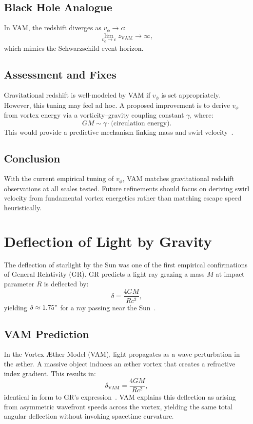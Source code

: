 \documentclass[a4paper, aps,preprint,superscriptaddress, 12pt]{revtex4}
\begin{document}
\subsection*{Black Hole Analogue}
In VAM, the redshift diverges as $v_\phi \to c$:
\[
    \lim_{v_\phi \to c} z_\text{VAM} \to \infty,
\]
which mimics the Schwarzschild event horizon.

\subsection*{Assessment and Fixes}
Gravitational redshift is well-modeled by VAM if $v_\phi$ is set appropriately. However, this tuning may feel ad hoc. A proposed improvement is to derive $v_\phi$ from vortex energy via a vorticity--gravity coupling constant $\gamma$, where:
\[
    GM \sim \gamma \cdot \text{(circulation energy)}.
\]
This would provide a predictive mechanism linking mass and swirl velocity~\cite{iskandarani2025VAM2}.

\subsection*{Conclusion}
With the current empirical tuning of $v_\phi$, VAM matches gravitational redshift observations at all scales tested. Future refinements should focus on deriving swirl velocity from fundamental vortex energetics rather than matching escape speed heuristically.
\section{Deflection of Light by Gravity}

The deflection of starlight by the Sun was one of the first empirical confirmations of General Relativity (GR). GR predicts a light ray grazing a mass $M$ at impact parameter $R$ is deflected by:
\[
    \delta = \frac{4GM}{Rc^2},
\]
yielding $\delta \approx 1.75"$ for a ray passing near the Sun~\cite{will2014confrontation}.

\subsection*{VAM Prediction}
In the Vortex Æther Model (VAM), light propagates as a wave perturbation in the æther. A massive object induces an æther vortex that creates a refractive index gradient. This results in:
\[
    \delta_\text{VAM} = \frac{4GM}{Rc^2},
\]
identical in form to GR's expression~\cite{iskandarani2025VAM2}. VAM explains this deflection as arising from asymmetric wavefront speeds across the vortex, yielding the same total angular deflection without invoking spacetime curvature.
\end{document}
